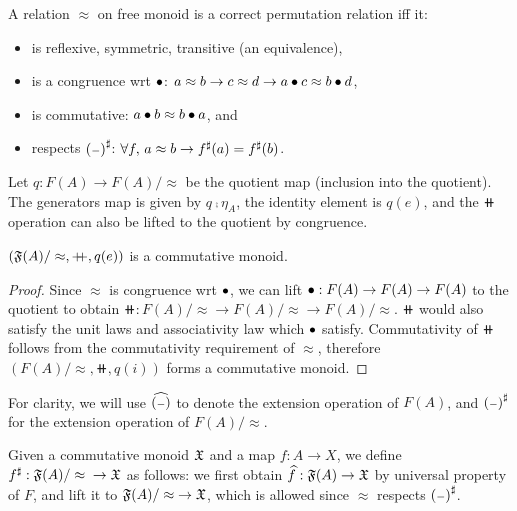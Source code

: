 
\begin{definition}
    \label{def:permutation-relation}
    \leavevmode
    A relation $\approx$ on free monoid is a correct permutation relation iff it:
    \begin{itemize}
        \item is reflexive, symmetric, transitive (an equivalence),
        \item is a congruence wrt $\mathbin{\bullet}$: $a \approx b \to c \approx d \to a \mathbin{\bullet} c \approx b \mathbin{\bullet} d$,
        \item is commutative: $a \mathbin{\bullet} b \approx b \mathbin{\bullet} a$, and
        \item respects ${({\scriptstyle{-}})}^{\sharp}$: $\forall f, \, a \approx b \to {f}^{\sharp}(a) = {f}^{\sharp}(b)$.
    \end{itemize}
\end{definition}

Let $q : F(A) \to {F(A) / \approx}$ be the quotient map (inclusion into the quotient).
%
The generators map is given by $q \comp \eta_A$, the identity element is $q(e)$,
and the $\doubleplus$ operation can also be lifted to the quotient by congruence.

\begin{proposition}
    $({\mathfrak{F}(A) / \approx}, \mathbin{+\kern -0.4em+}, q(e))$ is a commutative monoid.
\end{proposition}

\begin{proof}
    Since $\approx$ is congruence wrt $\mathbin{\bullet}$,
    we can lift $\mathbin{\bullet} : F(A) \to F(A) \to F(A)$ to the quotient to obtain
    $\doubleplus : {F(A) / \approx} \to {F(A) / \approx} \to {F(A) / \approx}$.
    $\doubleplus$ would also satisfy the unit laws and associativity law which $\mathbin{\bullet}$ satisfy.
    Commutativity of $\doubleplus$ follows from the commutativity requirement of $\approx$,
    therefore $({F(A) / \approx}, \doubleplus, q(i))$ forms a commutative monoid.
\end{proof}

For clarity, we will use $\widehat{({\scriptstyle{-}})}$ to denote the extension operation of $F(A)$,
and ${({\scriptstyle{-}})}^{\sharp}$ for the extension operation of ${F(A) / \approx}$.

\begin{definition}
    Given a commutative monoid $\mathfrak{X}$ and a map $f : A \to X$,
    we define
    ${f}^{\sharp} : {\mathfrak{F}(A) / \approx} \; \to \mathfrak{X}$ as follows:
    we first obtain $\widehat{f} : \mathfrak{F}(A) \to \mathfrak{X}$ by universal property of $F$, and lift it
    to ${\mathfrak{F}(A)/\approx} \to \mathfrak{X}$, which is allowed since $\approx$ respects ${({\scriptstyle{-}})}^{\sharp}$.
\end{definition}

